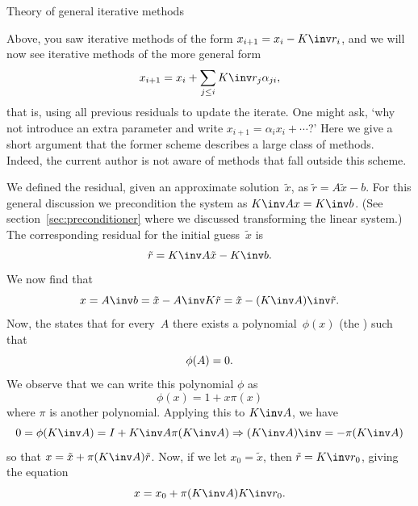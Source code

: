 
 {Theory of general iterative methods}
\label{sec:nonstationary}

Above, you saw iterative methods of the form $x_{i+1}=x_i-K\inv r_i$,
and we will now see iterative methods of the more general form
\begin{equation}
  x_{i+1}=x_i+\sum_{j\leq i}K\inv r_j\alpha_{ji},
  \label{eq:it-general-x}
\end{equation}
that is, using all previous residuals to update the iterate.
One might ask, `why not introduce an extra
parameter and write $x_{i+1}=\alpha_i x_i+\cdots$?' Here we give a
short argument that the former scheme describes a large class of
methods. Indeed, the current author is not aware of methods that fall
outside this scheme.

We defined the residual, given an approximate solution~$\tilde x$, as
$ \tilde r=A\tilde x-b $. For this general discussion we precondition the system
as $K\inv Ax=K\inv b$. (See section~\ref{sec:preconditioner} where we
discussed transforming the linear system.)
The corresponding residual for the initial
guess~$\tilde x$ is
\[ \tilde r = K\inv A\tilde x-K\inv b. \]
We now find that 
\[ x=A\inv b=\tilde x-A\inv K\tilde r = \tilde x-(K\inv A)\inv \tilde r. \]
%
Now, the  states that for
every~$ A $ there exists a polynomial~$\phi(x)$ (the
) such that
\[ \phi(A)=\nobreak0 .\]
We observe that we can write this polynomial $\phi$ as
\[ \phi(x)=1+x\pi(x) \]
where $\pi$ is another polynomial.
%
Applying this to $K\inv A$, we have
\[
  0 = \phi( K\inv A ) = I + K\inv A \pi( K\inv A ) 
  \Rightarrow
  (K\inv A)\inv=-\pi(K\inv A)
\]
so that $ x = \tilde x + \pi(K\inv A)\tilde r $. Now, if we let
$x_0=\tilde x$, then $\tilde r = K\inv r_0$, giving the equation
\[ x = x_0 + \pi(K\inv A)K\inv r_0. \]

